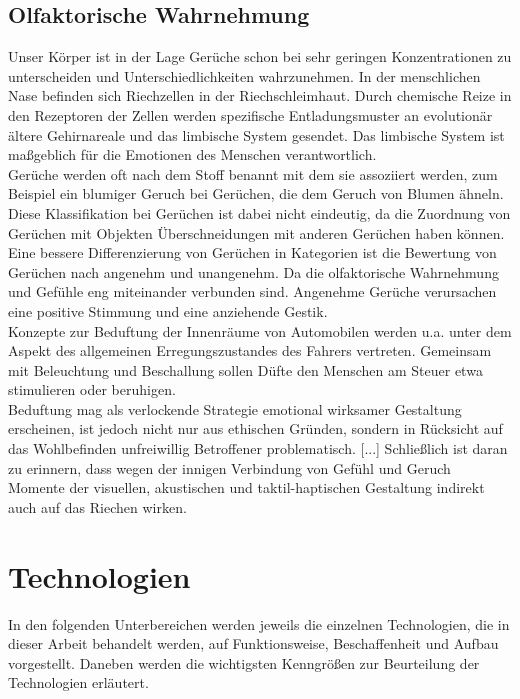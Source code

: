 \subsection{Olfaktorische Wahrnehmung}
Unser Körper ist in der Lage Gerüche schon bei sehr geringen Konzentrationen zu unterscheiden und Unterschiedlichkeiten wahrzunehmen. In der menschlichen Nase befinden sich Riechzellen in der Riechschleimhaut. Durch chemische Reize in den Rezeptoren der Zellen werden spezifische Entladungsmuster an evolutionär ältere Gehirnareale und das limbische System gesendet. Das limbische System ist maßgeblich für die Emotionen des Menschen verantwortlich. \cite[Vgl. Seite 102]{Schonhammer.2013}\\
Gerüche werden oft nach dem Stoff benannt mit dem sie assoziiert werden, zum Beispiel ein blumiger Geruch bei Gerüchen, die dem Geruch von Blumen ähneln. Diese Klassifikation bei Gerüchen ist dabei nicht eindeutig, da die Zuordnung von Gerüchen mit Objekten Überschneidungen mit anderen Gerüchen haben können. Eine bessere Differenzierung von Gerüchen in Kategorien ist die Bewertung von Gerüchen nach angenehm und unangenehm. Da die olfaktorische Wahrnehmung und Gefühle eng miteinander verbunden sind. Angenehme Gerüche verursachen eine positive Stimmung und eine anziehende Gestik. \cite[Vgl. Seite 105f]{Schonhammer.2013}\\
\glqq Konzepte zur Beduftung der Innenräume von Automobilen werden u.a. unter dem Aspekt des allgemeinen Erregungszustandes des Fahrers vertreten. Gemeinsam mit Beleuchtung und Beschallung sollen Düfte den Menschen am Steuer etwa stimulieren oder beruhigen.\grqq{} \cite[Seite 122f]{Schonhammer.2013}\\
\glqq Beduftung mag als verlockende Strategie emotional wirksamer Gestaltung erscheinen, ist jedoch nicht nur aus ethischen Gründen, sondern in Rücksicht auf das Wohlbefinden unfreiwillig Betroffener problematisch. [...] Schließlich ist daran zu erinnern, dass wegen der innigen Verbindung von Gefühl und Geruch Momente der visuellen, akustischen und taktil-haptischen Gestaltung indirekt auch auf das Riechen wirken. \grqq{} \cite[Seite 123]{Schonhammer.2013}
\section{Technologien}
In den folgenden Unterbereichen werden jeweils die einzelnen Technologien, die in dieser Arbeit behandelt werden, auf Funktionsweise, Beschaffenheit und Aufbau vorgestellt. Daneben werden die wichtigsten Kenngrößen zur Beurteilung der Technologien erläutert.
